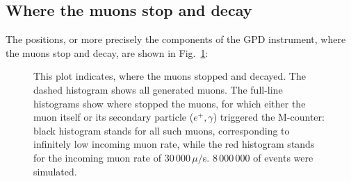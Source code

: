 \documentclass[twoside]{dis04}
\begin{document}
\subsection{Where the muons stop and decay}
\label{sect_muons}
The positions, or more precisely the components of the GPD instrument, where the muons 
stop and decay, are shown in Fig.~\ref{humanDecayHistograms_1}:
%
\begin{figure}[tbp]\centering
\epsfig{file=pict/Plot201_1.eps,width=0.9\linewidth,%
clip=}
\caption{This plot indicates, where the muons stopped and decayed. 
The dashed histogram shows all generated muons. The full-line histograms show
where stopped the muons, for which either the muon itself or its secondary
particle ($e^+, \gamma$) triggered the M-counter:  black histogram stands for
all such muons, corresponding to infinitely low incoming muon rate, while
the red histogram stands for the incoming muon rate of 30\,000\,$\mu/$s.
8\,000\,000 of events were simulated.}
\label{humanDecayHistograms_1}
\end{figure}
%
\end{document}
